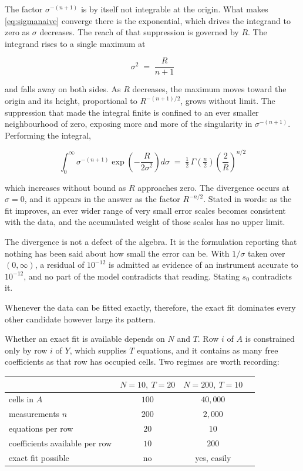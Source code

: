 The factor $\sigma^{-(n+1)}$ is by itself not integrable at the origin. What makes
\eqref{eq:sigmanaive} converge there is the exponential, which drives the integrand
to zero as $\sigma$ decreases. The reach of that suppression is governed by $R$. The
integrand rises to a single maximum at

\begin{equation}
\sigma^{2} \;=\; \frac{R}{n+1}
\label{eq:peak}
\end{equation}

and falls away on both sides. As $R$ decreases, the maximum moves toward the origin
and its height, proportional to $R^{-(n+1)/2}$, grows without limit. The suppression
that made the integral finite is confined to an ever smaller neighbourhood of zero,
exposing more and more of the singularity in $\sigma^{-(n+1)}$. Performing the
integral,

\begin{equation}
\int_{0}^{\infty} \sigma^{-(n+1)}
\exp\!\left( -\frac{R}{2\sigma^{2}} \right) d\sigma
\;=\; \tfrac{1}{2}\, \Gamma\!\left( \tfrac{n}{2} \right)
\left( \frac{2}{R} \right)^{n/2}
\label{eq:sigmaunbounded}
\end{equation}

which increases without bound as $R$ approaches zero. The divergence occurs at
$\sigma = 0$, and it appears in the answer as the factor $R^{-n/2}$. Stated in words:
as the fit improves, an ever wider range of very small error scales becomes
consistent with the data, and the accumulated weight of those scales has no upper
limit.

The divergence is not a defect of the algebra. It is the formulation reporting that
nothing has been said about how small the error can be. With $1/\sigma$ taken over
$(0,\infty)$, a residual of $10^{-12}$ is admitted as evidence of an instrument
accurate to $10^{-12}$, and no part of the model contradicts that reading. Stating
$s_{0}$ contradicts it.

Whenever the data can be fitted exactly, therefore, the exact fit dominates every
other candidate however large its pattern.

Whether an exact fit is available depends on $N$ and $T$. Row $i$ of $A$ is
constrained only by row $i$ of $Y$, which supplies $T$ equations, and it contains as
many free coefficients as that row has occupied cells. Two regimes are worth
recording:

\begin{center}
\begin{tabular}{lccl}
 & $N=10,\ T=20$ & $N=200,\ T=10$ & \\
\hline
cells in $A$      & $100$  & $40{,}000$ & \\
measurements $n$  & $200$  & $2{,}000$  & \\
equations per row & $20$   & $10$       & \\
coefficients available per row & $10$ & $200$ & \\
exact fit possible & no & yes, easily & \\
\end{tabular}
\end{center}

